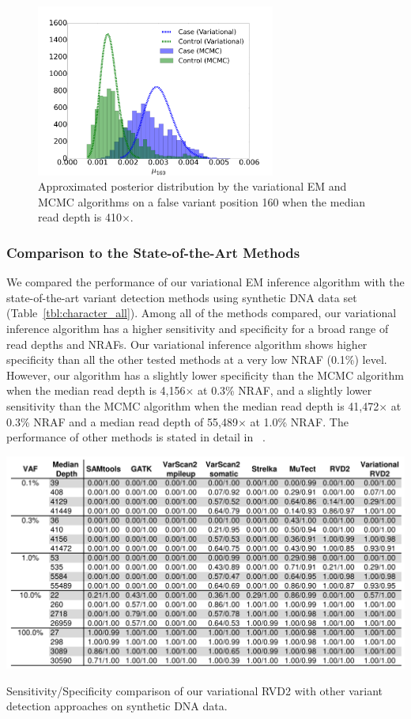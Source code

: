 \documentclass[11pt,reqno]{amsart}
\begin{document}
\begin{figure}[htbp]
\centering
\includegraphics[width=0.7\textwidth]{figs/position_160_410_mcmc_vs_var_mu_fig2.png}
\caption{Approximated posterior distribution by the variational EM and MCMC algorithms on a false variant position 160 when the median read depth is 410$\times$.}
\label{tbl:compare2}
\end{figure}
\subsubsection{Comparison to the State-of-the-Art Methods}
We compared the performance of our variational EM inference algorithm with the state-of-the-art variant detection methods using synthetic DNA data set (Table~\ref{tbl:character_all}).
Among all of the methods compared, our variational inference algorithm has a higher sensitivity and specificity for a broad range of read depths and NRAFs.
Our variational inference algorithm shows higher specificity than all the other tested methods at a very low NRAF (0.1\%) level.
However, our algorithm has a slightly lower specificity than the MCMC algorithm when the median read depth is 4,156$\times$ at 0.3\% NRAF, and a slightly lower sensitivity than the MCMC algorithm when the median read depth is 41,472$\times$ at 0.3\% NRAF and a median read depth of 55,489$\times$ at 1.0\% NRAF.
The performance of other methods is stated in detail in ~\citep{he2015rvd2}.
\begin{table}[htbp]
\centering
\includegraphics[width=1.0\textwidth]{tables/character_all.png}
\caption{Sensitivity/Specificity comparison of our variational RVD2 with other variant detection approaches on synthetic DNA data.}
\vspace{-5pt}
\label{tbl:character_all}
\end{table}
\end{document}
